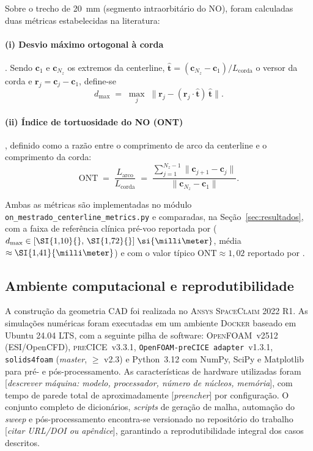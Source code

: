 Sobre o trecho de \SI{20}{\milli\meter} (segmento intraorbitário do NO),
foram calculadas duas métricas estabelecidas na literatura:

\paragraph{(i) Desvio máximo ortogonal à corda} \citep{Lee2020NPJ}.
Sendo \(\mathbf{c}_1\) e \(\mathbf{c}_{N_z}\) os extremos da centerline,
\(\hat{\mathbf{t}} = (\mathbf{c}_{N_z}-\mathbf{c}_1)/L_{\mathrm{corda}}\)
o versor da corda e
\(\mathbf{r}_j = \mathbf{c}_j - \mathbf{c}_1\), define-se
\begin{equation}
  d_{\max}
  \;=\;
  \max_{j}\;
  \bigl\lVert \mathbf{r}_j - (\mathbf{r}_j \cdot \hat{\mathbf{t}})\,\hat{\mathbf{t}} \bigr\rVert.
  \label{eq:dmax}
\end{equation}

\paragraph{(ii) Índice de tortuosidade do NO (ONT)}
\citep{Chiang2025ONT}, definido como a razão entre o comprimento de arco da
centerline e o comprimento da corda:
\begin{equation}
  \mathrm{ONT}
  \;=\;
  \frac{L_{\mathrm{arco}}}{L_{\mathrm{corda}}}
  \;=\;
  \frac{\displaystyle \sum_{j=1}^{N_z - 1} \lVert \mathbf{c}_{j+1} - \mathbf{c}_j \rVert}
       {\lVert \mathbf{c}_{N_z} - \mathbf{c}_1 \rVert}.
  \label{eq:ont}
\end{equation}

Ambas as métricas são implementadas no módulo
\texttt{on\_mestrado\_centerline\_metrics.py} e comparadas, na
Seção~\ref{sec:resultados}, com a faixa de referência clínica pré-voo
reportada por \citet{Lee2020NPJ}
(\(d_{\max} \in [\SI{1{,}10}{},\,\SI{1{,}72}{}]\;\si{\milli\meter}\),
média \(\approx \SI{1{,}41}{\milli\meter}\)) e com o valor típico
\(\mathrm{ONT} \approx 1{,}02\) reportado por \citet{Chiang2025ONT}.

\subsection{Ambiente computacional e reprodutibilidade}
\label{sec:metodologia-ambiente}

A construção da geometria CAD foi realizada no
\textsc{Ansys SpaceClaim 2022 R1}. As simulações numéricas foram executadas
em um ambiente \textsc{Docker} baseado em Ubuntu 24.04 LTS, com a seguinte
pilha de software: \textsc{OpenFOAM}~v2512 (ESI/OpenCFD), \textsc{preCICE}~v3.3.1,
\texttt{OpenFOAM-preCICE adapter}~v1.3.1, \texttt{solids4foam} (\emph{master},
\(\geq\) v2.3) e Python~3.12 com NumPy, SciPy e Matplotlib para
pré- e pós-processamento. As características de hardware utilizadas foram
[\emph{descrever máquina: modelo, processador, número de núcleos, memória}],
com tempo de parede total de aproximadamente [\emph{preencher}] por
configuração. O conjunto completo de dicionários, \emph{scripts} de
geração de malha, automação do \emph{sweep} e pós-processamento encontra-se
versionado no repositório do trabalho [\emph{citar URL/DOI ou apêndice}],
garantindo a reprodutibilidade integral dos casos descritos.

